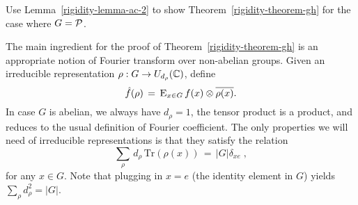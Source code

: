 \begin{exercise}
Use Lemma~\ref{rigidity-lemma-ac-2} to show Theorem~\ref{rigidity-theorem-gh} for the case where $G=\mathcal{P}$. 
\end{exercise}

The main ingredient for the proof of Theorem~\ref{rigidity-theorem-gh} is an appropriate notion of Fourier transform over non-abelian groups. Given an irreducible representation $\rho: G \to U_{d_\rho}(\mathbb{C})$, define 
\begin{equation}\label{equation-fourier}
 \hat{f}(\rho) \,=\, \textsc{E}_{x\in G} \,f(x) \otimes \overline{\rho(x)}.
\end{equation}
In case $G$ is abelian, we always have $d_\rho=1$, the tensor product is a product, and  reduces to the usual definition of Fourier coefficient. The only properties we will need of irreducible representations is that they satisfy the relation
\begin{equation}
\label{equation-ortho}
\sum_\rho \,d_\rho\,\mathrm{Tr}(\rho(x)) \,=\, |G|\delta_{xe}\;,
\end{equation}
for any $x\in G$. Note that plugging in $x=e$ (the identity element in $G$) yields $\sum_\rho d_\rho^2= |G|$. 

